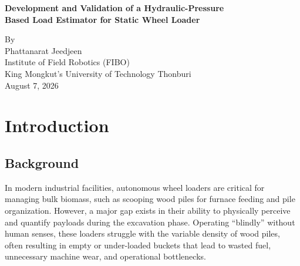 \documentclass[12pt, a4paper]{article}
\begin{document}
\thispagestyle{empty}
\setlength{\baselineskip}{17pt}

\begin{center}
    \vspace{0.3cm}
    {\bfseries\fontsize{20}{24}\selectfont
    Development and Validation of a Hydraulic-Pressure \\
    Based Load Estimator for Static Wheel Loader}

    \vspace{0.8cm}
    {\fontsize{16}{20}\selectfont
    By \\
    Phattanarat Jeedjeen \\
    Institute of Field Robotics (FIBO) \\
    King Mongkut's University of Technology Thonburi \\
    \vspace{0.3cm}
    August 7, 2026
    }
\end{center}

\vspace{0.5cm}
\tableofcontents
\clearpage

\fontsize{14}{17}\selectfont
\setlength{\baselineskip}{17pt}

\section{Introduction}

\subsection{Background}
In modern industrial facilities, autonomous wheel loaders are critical for managing bulk biomass, such as scooping wood piles for furnace feeding and pile organization. However, a major gap exists in their ability to physically perceive and quantify payloads during the excavation phase. Operating ``blindly'' without human senses, these loaders struggle with the variable density of wood piles, often resulting in empty or under-loaded buckets that lead to wasted fuel, unnecessary machine wear, and operational bottlenecks. 
\end{document}
